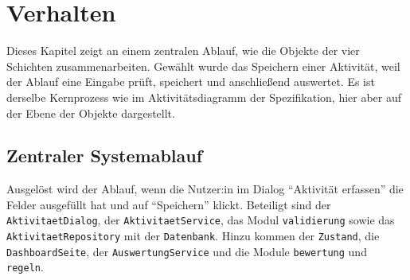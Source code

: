 \section{Verhalten}
Dieses Kapitel zeigt an einem zentralen Ablauf, wie die Objekte der vier Schichten zusammenarbeiten. Gewählt wurde das Speichern einer Aktivität, weil der Ablauf eine Eingabe prüft, speichert und anschließend auswertet. Es ist derselbe Kernprozess wie im Aktivitätsdiagramm der Spezifikation, hier aber auf der Ebene der Objekte dargestellt.

\subsection{Zentraler Systemablauf}
Ausgelöst wird der Ablauf, wenn die Nutzer:in im Dialog \enquote{Aktivität erfassen} die Felder ausgefüllt hat und auf \enquote{Speichern} klickt. Beteiligt sind der \texttt{AktivitaetDialog}, der \texttt{AktivitaetService}, das Modul \texttt{validierung} sowie das \texttt{AktivitaetRepository} mit der \texttt{Datenbank}. Hinzu kommen der \texttt{Zustand}, die \texttt{DashboardSeite}, der \texttt{AuswertungService} und die Module \texttt{bewertung} und \texttt{regeln}.

